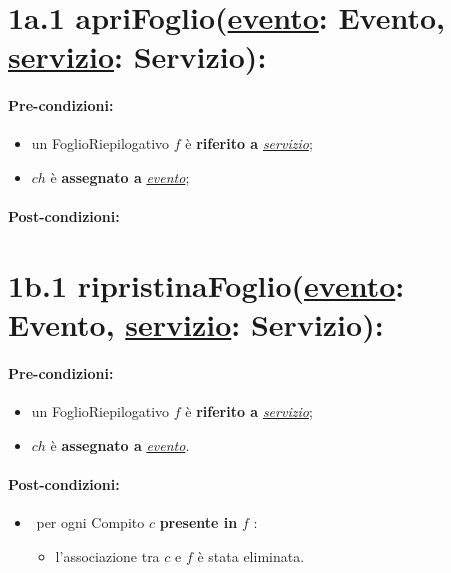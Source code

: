 \section*{1a.1 apriFoglio(\underline{evento}: Evento, \underline{servizio}: Servizio):}

\paragraph{Pre-condizioni:}

\begin{itemize}
  \item un FoglioRiepilogativo $f$ è \textbf{riferito a} \underline{\textit{servizio}};
  \item $ch$ è \textbf{assegnato a} \underline{\textit{evento}};
\end{itemize}

\paragraph{Post-condizioni:}

\section*{1b.1 ripristinaFoglio(\underline{evento}: Evento, \underline{servizio}: Servizio):}

\paragraph{Pre-condizioni:}

\begin{itemize}
  \item un FoglioRiepilogativo $f$ è \textbf{riferito a} \underline{\textit{servizio}};
  \item $ch$ è \textbf{assegnato a} \underline{\textit{evento}}.
\end{itemize}

\paragraph{Post-condizioni:}

\begin{itemize}
    \item \textlangle $ $ per ogni Compito $c$ \textbf{presente in} $f$ \textrangle:
    \begin{itemize}
        \item l'associazione tra $c$ e $f$ è stata eliminata.
    \end{itemize}
\end{itemize}

